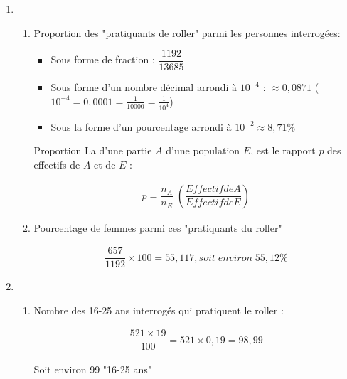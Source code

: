 \documentclass[12pt,a4paper]{article}
\begin{document}
\begin{enumerate}[label=\arabic*.]
	\item 
	\begin{enumerate} [label=\alph*) ]
		\item Proportion des "pratiquants de roller" parmi les personnes interrogées:
		\begin{itemize}
			\item Sous forme de fraction : $\dfrac{1192}{13685}$
			\item Sous forme d'un nombre décimal arrondi à $10^{-4}$ : $\approx 0,0871$ ($10^{-4} = 0,0001=\frac{1}{10000}=\frac{1}{10^4}$)
			\item Sous la forme d'un pourcentage arrondi à $10^{-2} \approx 8,71 \% $
		\end{itemize}
		
		\vspace*{1cm}
		
		\hspace*{-5cm} \begin{mybilan2}{Proportion}
			La  d'une partie $A$ d'une population $E$, est le rapport $p$ des effectifs de $A$ et de $E$ :
			
			\begin{eqnarray*}
			p = \dfrac{n_A}{n_E} \; \left(\dfrac{Effectif de A}{Effectif de E}\right)
			\end{eqnarray*}
		\end{mybilan2}
				
		\item Pourcentage de femmes parmi ces "pratiquants du roller"
		
		\begin{align*}
			 \dfrac{657}{1192} \times 100 = 55,117, soit\; environ\; 55,12 \%
		\end{align*}
						

	\end{enumerate}
	
	\item \begin{enumerate}[label=\alph*) ]
		\item Nombre des 16-25 ans interrogés qui pratiquent le roller :
		
		\begin{eqnarray*}
			\dfrac{521 \times 19}{100} = 521 \times 0,19 = 98,99
		\end{eqnarray*}
		
		Soit environ 99 "16-25 ans"
		

\end{enumerate}
\end{enumerate}
\end{document}
